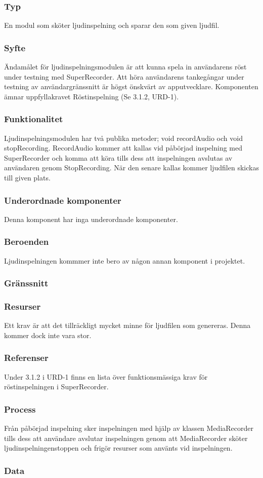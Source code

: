 \subsubsection{Typ}
En modul som sköter ljudinspelning och sparar den som given ljudfil.

\subsubsection{Syfte}
Ändamålet för ljudinspelningsmodulen är att kunna spela in användarens röst under testning med SuperRecorder. Att höra användarens tankegångar under testning av användargränssnitt är högst önskvärt av apputvecklare. Komponenten ämnar uppfyllakravet Röstinspelning (Se 3.1.2, URD-1).

\subsubsection{Funktionalitet}
Ljudinspelningsmodulen har två publika metoder; void recordAudio och void stopRecording. RecordAudio kommer att kallas vid påbörjad inspelning med SuperRecorder och komma att köra tills dess att inspelningen avslutas av användaren genom StopRecording. När den senare kallas kommer ljudfilen skickas till given plats.

\subsubsection{Underordnade komponenter}
Denna komponent har inga underordnade komponenter.

\subsubsection{Beroenden}
Ljudinspelningen kommmer inte bero av någon annan komponent i projektet.

\subsubsection{Gränssnitt}

\subsubsection{Resurser}
Ett krav är att det tillräckligt mycket minne för ljudfilen som genereras. Denna kommer dock inte vara stor.

\subsubsection{Referenser}
Under 3.1.2 i URD-1 finns en lista över funktionsmässiga krav för röstinspelningen i SuperRecorder.

\subsubsection{Process}
Från påbörjad inspelning sker inspelningen med hjälp av klassen MediaRecorder tills dess att användare avslutar inspelningen genom att MediaRecorder sköter ljudinspelningenstoppen och frigör resurser som använts vid inspelningen.

\subsubsection{Data}
